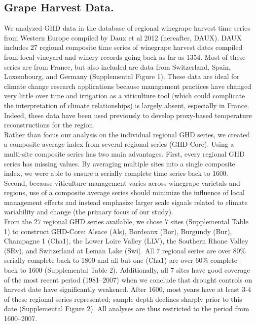 \documentclass[final]{nature}
\begin{document}

\begin{methods}
\subsection{Grape Harvest Data.}
\noindent We analyzed GHD data in the database of regional winegrape harvest time series from Western Europe compiled by Daux et al 2012 (hereafter, DAUX\cite{Daux2012}). DAUX includes 27 regional composite time series of winegrape harvest dates compiled from local vineyard and winery records going back as far as 1354. Most of these series are from France, but also included are data from Switzerland, Spain, Luxembourg, and Germany (Supplemental Figure 1). These data are ideal for climate change research applications because management practices have changed very little over time and irrigation as a viticulture tool (which could complicate the interpretation of climate relationships) is largely absent, especially in France. Indeed, these data have been used previously to develop proxy-based temperature reconstructions for the region\cite{Daux2012}.\\
\indent Rather than focus our analysis on the individual regional GHD series, we created a composite average index from several regional series (GHD-Core). Using a multi-site composite series has two main advantages. First, every regional GHD series has missing values. By averaging multiple sites into a single composite index, we were able to ensure a serially complete time series back to 1600. Second, because viticulture management varies across winegrape varietals and regions, use of a composite average series should minimize the influence of local management effects and instead emphasize larger scale signals related to climate variability and change (the primary focus of our study).\\
\indent From the 27 regional GHD series available, we chose 7 sites (Supplemental Table 1) to construct GHD-Core: Alsace (Als), Bordeaux (Bor), Burgundy (Bur), Champagne 1 (Cha1), the Lower Loire Valley (LLV), the Southern Rhone Valley (SRv), and Switzerland at Leman Lake (Swi). All 7 regional series are over 80\% serially complete back to 1800 and all but one (Cha1) are over 60\% complete back to 1600 (Supplemental Table 2). Additionally, all 7 sites have good coverage of the most recent period (1981--2007) when we conclude that drought controls on harvest date have significantly weakened. After 1600, most years have at least 3-4 of these regional series represented; sample depth declines sharply prior to this date (Supplemental Figure 2). All analyses are thus restricted to the period from 1600--2007.\\

\end{methods}
\end{document}
